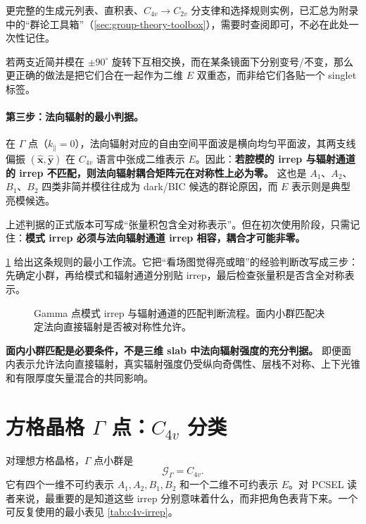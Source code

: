 更完整的生成元列表、直积表、$C_{4v}\to C_{2v}$ 分支律和选择规则实例，已汇总为附录中的“群论工具箱”（\cref{sec:group-theory-toolbox}），需要时查阅即可，不必在此处一次性记住。

若两支近简并模在 $\pm90^\circ$ 旋转下互相交换，而在某条镜面下分别变号/不变，那么更正确的做法是把它们合在一起作为二维 $E$ 双重态，而非给它们各贴一个 singlet 标签。

\paragraph{第三步：法向辐射的最小判据。}
在 $\Gamma$ 点（$k_\parallel=0$），法向辐射对应的自由空间平面波是横向均匀平面波，其两支线偏振 $(\hat{\bm x},\hat{\bm y})$ 在 $C_{4v}$ 语言中张成二维表示 $E$。因此：\textbf{若腔模的 irrep 与辐射通道的 irrep 不匹配，则法向辐射耦合矩阵元在对称性上必为零。} 这也是 $A_1$、$A_2$、$B_1$、$B_2$ 四类非简并模往往成为 dark/BIC 候选的群论原因，而 $E$ 表示则是典型亮模候选\cite{sakoda2005,joannopoulos2008,hsu2016}。

上述判据的正式版本可写成“张量积包含全对称表示”。但在初次使用阶段，只需记住：\textbf{模式 irrep 必须与法向辐射通道 irrep 相容，耦合才可能非零。}

\cref{fig:ch08_irrep_radiation_gate} 给出这条规则的最小工作流。它把“看场图觉得亮或暗”的经验判断改写成三步：先确定小群，再给模式和辐射通道分别贴 irrep，最后检查张量积是否含全对称表示。

\begin{figure}[htbp]
  \centering
  
  \caption{Gamma 点模式 irrep 与辐射通道的匹配判断流程。面内小群匹配决定法向直接辐射是否被对称性允许。}
  \label{fig:ch08_irrep_radiation_gate}
\end{figure}

\begin{PitfallBox}
\textbf{面内小群匹配是必要条件，不是三维 slab 中法向辐射强度的充分判据。} 即便面内表示允许法向直接辐射，真实辐射强度仍受纵向奇偶性、层栈不对称、上下光锥和有限厚度矢量混合的共同影响。
\end{PitfallBox}


\section{方格晶格 \texorpdfstring{$\Gamma$}{Gamma} 点：\texorpdfstring{$C_{4v}$}{C4v} 分类}
对理想方格晶格，$\Gamma$ 点小群是
\[
\mathcal{G}_{\Gamma}=C_{4v}.
\]
它有四个一维不可约表示 $A_1,A_2,B_1,B_2$ 和一个二维不可约表示 $E$。对 PCSEL 读者来说，最重要的是知道这些 irrep 分别意味着什么，而非把角色表背下来。一个可反复使用的最小表见 \cref{tab:c4v-irrep}。

